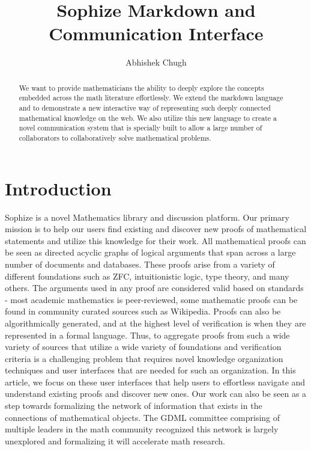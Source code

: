 \documentclass[a4paper]{article}
\title{Sophize Markdown and Communication Interface }
\author{
Abhishek Chugh
}
\begin{document}
\maketitle

\begin{abstract}
We want to provide mathematicians the ability to deeply explore the concepts embedded across the math literature effortlessly. We extend the markdown language and to demonstrate a new interactive way of representing such deeply connected mathematical knowledge on the web. We also utilize this new language to create a novel communication system that is specially built to allow a large number of collaborators to collaboratively solve mathematical problems.
\end{abstract}
\vskip 32pt


\section{Introduction}

Sophize is a novel Mathematics library and discussion platform. Our primary mission is to help our users find existing and discover new proofs of mathematical statements and utilize this knowledge for their work. All mathematical proofs can be seen as directed acyclic graphs of logical arguments that span across a large number of documents and databases. These proofs arise from a variety of different foundations such as ZFC, intuitionistic logic, type theory, and many others. The arguments used in any proof are considered valid based on standards - most academic mathematics is peer-reviewed, some mathematic proofs can be found in community curated sources such as Wikipedia. Proofs can also be algorithmically generated, and at the highest level of verification is when they are represented in a formal language. Thus, to aggregate proofs from such a wide variety of sources that utilize a wide variety of foundations and verification criteria is a challenging problem that requires novel knowledge organization techniques and user interfaces that are needed for such an organization. In this article, we focus on these user interfaces that help users to effortless navigate and understand existing proofs and discover new ones.  Our work can also be seen as a step towards formalizing the network of information that exists in the connections of mathematical objects. The GDML committee comprising of multiple leaders in the math community recognized this network is largely unexplored and formalizing it will accelerate math research.
\end{document}
